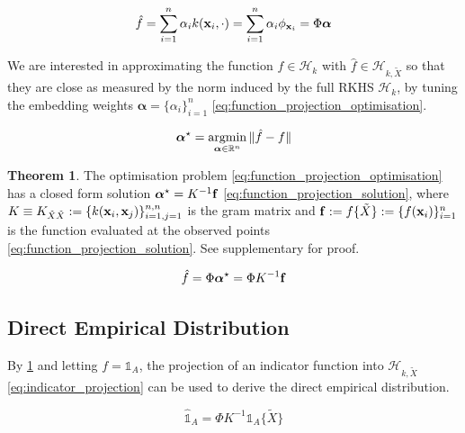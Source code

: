 \documentclass[twoside]{article} \usepackage{aistats2017}
\theoremstyle{definition}
\theoremstyle{theorem}
\newtheorem{theorem}{Theorem}[section]
\newcommand{\argmin}{\operatornamewithlimits{argmin}}
\newcommand{\ds}[1]{\tilde{#1}}
\begin{document}
		\begin{equation}
			\hat{f} = \sum_{i = 1}^{n} \alpha_{i} k(\mathbf{x}_{i}, \cdot) = \sum_{i = 1}^{n} \alpha_{i} \phi_{\mathbf{x}_{i}} = \Phi \bm{\alpha}
		\label{eq:function_projection}
		\end{equation}
	
		We are interested in approximating the function $f \in \mathcal{H}_{k}$ with $\hat{f} \in \mathcal{H}_{k, \ds{X}}$ so that they are close as measured by the norm induced by the full RKHS $\mathcal{H}_{k}$, by tuning the embedding weights $\bm{\alpha} = \{\alpha_{i}\}_{i = 1}^{n}$ \eqref{eq:function_projection_optimisation}.
			
		\begin{equation}
			\bm{\alpha}^{\star} = \argmin_{\bm{\alpha} \in \mathbb{R}^{n}} \Vert \hat{f} - f \Vert
		\label{eq:function_projection_optimisation}
		\end{equation}
		
		\begin{theorem} \label{thm:function_projection_solution}
			The optimisation problem \eqref{eq:function_projection_optimisation} has a closed form solution $\bm{\alpha}^{\star} = K^{-1} \mathbf{f}$ \eqref{eq:function_projection_solution}, where $K \equiv K_{\ds{X} \ds{X}} := \{k(\bvec{x}_{i}, \bvec{x}_{j})\}_{i = 1, j = 1}^{n, n}$ is the gram matrix and $\bvec{f} := f\{\ds{X}\} := \{f(\bvec{x}_{i})\}_{i = 1}^{n}$ is the function evaluated at the observed points \eqref{eq:function_projection_solution}. See supplementary for proof.
			
			\begin{equation}
				\hat{f} = \Phi \bm{\alpha}^{\star} = \Phi K^{-1} \mathbf{f}
			\label{eq:function_projection_solution}
			\end{equation}
		\end{theorem}
		
	\subsection{Direct Empirical Distribution}
	\label{sec:direct_quantile_regression:optimal_empirical_distribution}
	
		By \cref{thm:function_projection_solution} and letting $f = \mathbb{1}_{A}$,  the projection of an indicator function into $\mathcal{H}_{k, \ds{X}}$ \eqref{eq:indicator_projection} can be used to derive the direct empirical distribution.
			
		\begin{equation}
			\hat{\mathbb{1}}_{A} = \Phi K^{-1} \mathbb{1}_{A}\{\ds{X}\}
		\label{eq:indicator_projection}
		\end{equation}
			
\end{document}
